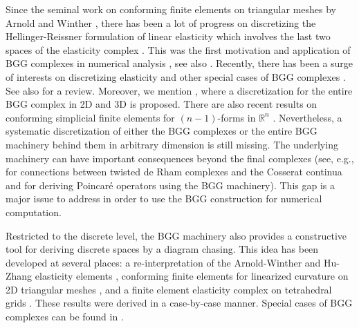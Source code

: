 \documentclass[final]{amsart}%
\newcommand{\0}{\mathaccent23}
\begin{document}
Since the seminal work on conforming finite elements on triangular meshes by Arnold and Winther \cite{arnold2002mixed}, there has been a lot of progress on discretizing the Hellinger-Reissner formulation of linear elasticity which involves the last two spaces of the elasticity complex \cite{arnold2018finite}. 
This was the first motivation and application of BGG complexes in numerical analysis \cite{Arnold2006a}, see also \cite{arnold2007mixed,eastwood2000complex}. Recently, there has been a surge of interests on discretizing elasticity and other special cases of BGG complexes \cite{arf2021structure,arnold2005rectangular, chen2020finite,chen2021finite,chen2021finite2,chen2020discrete,hu2021conforming,hu2021conforming2,hu2022new,sander2021conforming,christiansen2020discrete,christiansen2019finite}. See also \cite{hu2022oberwolfach} for a review.  
Moreover, we mention \cite{chen2022complexes,chen2023finite}, where a discretization for the entire BGG complex in 2D and 3D is proposed. There are also recent results on conforming simplicial finite elements for $(n-1)$-forms in $\mathbb{R}^n$ \cite{chen2021geometric}. Nevertheless, a systematic discretization of either the BGG complexes or the entire BGG machinery behind them in arbitrary dimension is still missing.
The underlying machinery can have important consequences beyond the final complexes (see, e.g., \cite{vcap2022bgg} for connections between twisted de Rham complexes and the Cosserat continua and \cite{christiansen2019poincare} for deriving Poincar\'e operators using the BGG machinery). 
This gap is a major issue to address in order to use the BGG construction for numerical computation. 

Restricted to the discrete level, the BGG machinery also provides a constructive tool for deriving discrete spaces by a diagram chasing. This idea has been developed at several places: a re-interpretation of the Arnold-Winther and Hu-Zhang elasticity elements \cite{Arnold2006a,christiansen2018nodal},   conforming finite elements for linearized curvature on 2D triangular meshes \cite{christiansen2019finite}, and a finite element elasticity complex on tetrahedral grids \cite{christiansen2020discrete}. These results were derived in a case-by-case manner. Special cases of BGG complexes  can be found in \cite{arf2021structure}.



\end{document}
